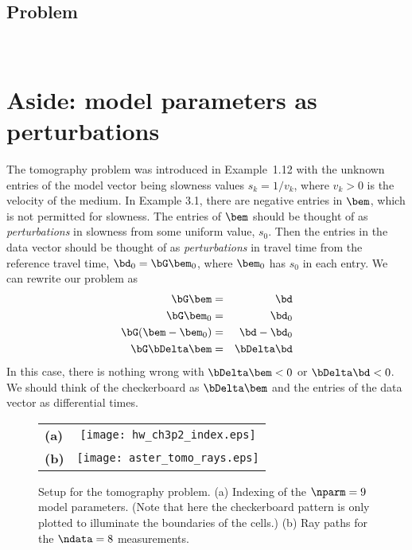 \documentclass[11pt,titlepage,fleqn]{article}
\begin{document}

\subsection*{Problem} \howmuchtime\

\pagebreak

\nocite{Aster}


\appendix

\section{Aside: model parameters as perturbations}
\label{sec:pert}

The tomography problem was introduced in Example~1.12 with the unknown entries of the model vector being slowness values $s_k = 1/v_k$, where $v_k > 0$ is the velocity of the medium. In \citet{Aster} Example 3.1, there are negative entries in $\bem$, which is not permitted for slowness. The entries of $\bem$ should be thought of as {\em perturbations} in slowness from some uniform value, $s_0$. Then the entries in the data vector should be thought of as {\em perturbations} in travel time from the reference travel time, $\bd_0 = \bG\bem_0$, where $\bem_0$ has $s_0$ in each entry. We can rewrite our problem as
%
\begin{eqnarray}
\bG\bem &=& \bd
\\
\bG\bem_0 &=& \bd_0
\\
\bG(\bem - \bem_0) &=& \bd - \bd_0
\\
\bG\bDelta\bem &=& \bDelta\bd
\end{eqnarray}
%
In this case, there is nothing wrong with $\bDelta\bem < 0$ or $\bDelta\bd < 0$. We should think of the checkerboard as $\bDelta\bem$ and the entries of the data vector as differential times.



\begin{figure}[h]
\centering
\begin{tabular}{lc}
{\bf(a)} & \texttt{[image: hw\_ch3p2\_index.eps]} \\
{\bf(b)} & \texttt{[image: aster\_tomo\_rays.eps]} \\
\end{tabular}
\caption[]
{{
Setup for the tomography problem.
(a) Indexing of the $\nparm=9$ model parameters.
(Note that here the checkerboard pattern is only plotted to illuminate the boundaries of the cells.)
(b) Ray paths for the $\ndata=8$ measurements.
\label{fig:index}
}}
\end{figure} 

\end{document}

